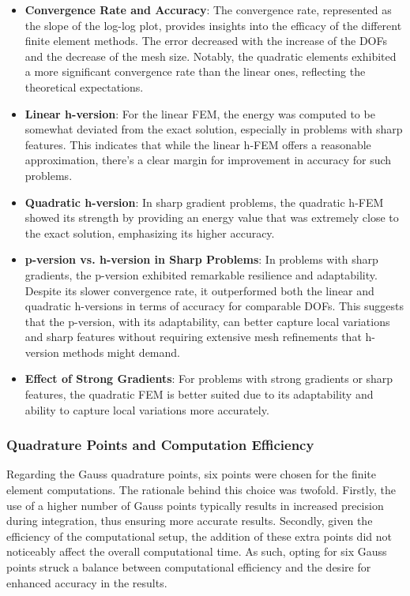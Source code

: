 \documentclass[twoside,twocolumn,10pt]{article}
\begin{document}
\begin{itemize}
    \item \textbf{Convergence Rate and Accuracy}: The convergence rate, represented as the slope of the log-log plot, provides insights into the efficacy of the different finite element methods. The error decreased with the increase of the DOFs and the decrease of the mesh size. Notably, the quadratic elements exhibited a more significant convergence rate than the linear ones, reflecting the theoretical expectations.
    
    \item \textbf{Linear h-version}: For the linear FEM, the energy was computed to be somewhat deviated from the exact solution, especially in problems with sharp features. This indicates that while the linear h-FEM offers a reasonable approximation, there's a clear margin for improvement in accuracy for such problems.
    
    \item \textbf{Quadratic h-version}: In sharp gradient problems, the quadratic h-FEM showed its strength by providing an energy value that was extremely close to the exact solution, emphasizing its higher accuracy.
    
    \item \textbf{p-version vs. h-version in Sharp Problems}: In problems with sharp gradients, the p-version exhibited remarkable resilience and adaptability. Despite its slower convergence rate, it outperformed both the linear and quadratic h-versions in terms of accuracy for comparable DOFs. This suggests that the p-version, with its adaptability, can better capture local variations and sharp features without requiring extensive mesh refinements that h-version methods might demand.
    
    \item \textbf{Effect of Strong Gradients}: For problems with strong gradients or sharp features, the quadratic FEM is better suited due to its adaptability and ability to capture local variations more accurately.
    
\end{itemize}

\subsubsection{Quadrature Points and Computation Efficiency}
Regarding the Gauss quadrature points, six points were chosen for the finite element computations. The rationale behind this choice was twofold. Firstly, the use of a higher number of Gauss points typically results in increased precision during integration, thus ensuring more accurate results. Secondly, given the efficiency of the computational setup, the addition of these extra points did not noticeably affect the overall computational time. As such, opting for six Gauss points struck a balance between computational efficiency and the desire for enhanced accuracy in the results.
\end{document}
